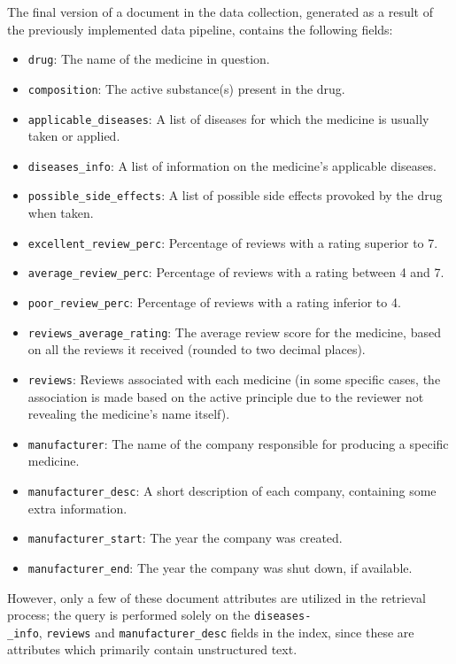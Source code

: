 \documentclass[sigconf]{acmart}
\begin{document}
The final version of a document in the data collection, generated as a result of the previously implemented data pipeline, contains the following fields:
\begin{itemize}
	\item {\texttt{drug}}: The name of the medicine in question.
	\item {\texttt{composition}}: The active substance(s) present in the drug.
	\item {\texttt{applicable\_diseases}}: A list of diseases for which the medicine is usually taken or applied.
	\item {\texttt{diseases\_info}}: A list of information on the medicine's applicable diseases.
	\item {\texttt{possible\_side\_effects}}: A list of possible side effects provoked by the drug when taken.
	\item {\texttt{excellent\_review\_perc}}: Percentage of reviews with a rating superior to 7.
	\item {\texttt{average\_review\_perc}}: Percentage of reviews with a rating between 4 and 7.
        \item {\texttt{poor\_review\_perc}}: Percentage of reviews
    with a rating inferior to 4.
        \item {\texttt{reviews\_average\_rating}}: The average review score for
    the medicine, based on all the reviews it received (rounded to two decimal places).
        \item {\texttt{reviews}}: Reviews associated with each medicine (in
    some specific cases, the association is made based on the active principle due to the reviewer not revealing the medicine's name itself).
        \item {\texttt{manufacturer}}: The name of the company responsible
    for producing a specific medicine.
        \item {\texttt{manufacturer\_desc}}: A short description of
    each company, containing some extra information.
        \item {\texttt{manufacturer\_start}}: The year the company was created.
        \item {\texttt{manufacturer\_end}}: The year the company was shut
    down, if available.
\end{itemize}

However, only a few of these document attributes are utilized in the retrieval process; the query is performed solely on the \texttt{diseases-\\\_info}, \texttt{reviews} and \texttt{manufacturer\_desc} fields in the index, since these are attributes which primarily contain unstructured text.
\end{document}
